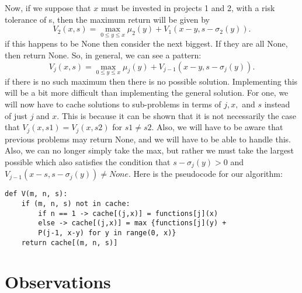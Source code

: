 \documentclass{article}
\begin{document}
Now, if we suppose that $x$ must be invested in projects 1 and 2, with a risk tolerance of s, then the maximum return will be given by 
$$V_{2}(x, s) = \max_{0\leq y\leq x} \mu_{2}(y) + V_{1}(x-y, s-\sigma_{2}(y)).$$
if this happens to be None then consider the next biggest.  If they are all None, then return None.
\newline
So, in general, we can see a pattern:
$$V_{j}(x, s) = \max_{0\leq y\leq x} \mu_{j}(y) + V_{j-1}(x-y,  s-\sigma_{j}(y)).$$
if there is no such maximum then there is no possible solution.
\newline
Implementing this will be a bit more difficult than implementing the general solution.  For one, we will now have to cache solutions to sub-problems in terms of $j, x,$ and $s$ instead of just $j$ and $x$.  This is because it can be shown that it is not necessarily the case that $V_{j}(x, s1) = V_{j}(x, s2)$ for $s1 \neq s2$.
Also, we will have to be aware that previous problems may return None, and we will have to be able to handle this. Also, we can no longer simply take the max, but rather we must take the largest possible which also satisfies the condition that $s-\sigma_{j}(y)>0$ and $V_{j-1}(x-s, s-\sigma_{j}(y)) \neq None$. 
\newline
Here is the pseudocode for our algorithm:
\newline
\begin{lstlisting}
def V(m, n, s):
    if (m, n, s) not in cache:
        if n == 1 -> cache[(j,x)] = functions[j](x)
        else -> cache[(j,x)] = max {functions[j](y) + 
        P(j-1, x-y) for y in range(0, x)}
    return cache[(m, n, s)]

\end{lstlisting}

\section{Observations}
\end{document}
